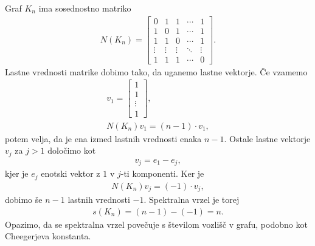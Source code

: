 \begin{primer}\label{polni-grafi-racun}
    Graf \(K_n\) ima sosednostno matriko
    \begin{align*}
        N(K_n) = \begin{bmatrix}
                     0      & 1      & 1      & \cdots & 1      \\
                     1      & 0      & 1      & \cdots & 1      \\
                     1      & 1      & 0      & \cdots & 1      \\
                     \vdots & \vdots & \vdots & \ddots & \vdots \\
                     1      & 1      & 1      & \cdots & 0
                 \end{bmatrix}.
    \end{align*}
    Lastne vrednosti matrike dobimo tako, da uganemo lastne vektorje. Če vzamemo
    \begin{align*}
        v_1 = \begin{bmatrix}
                  1      \\
                  1      \\
                  \vdots \\
                  1
              \end{bmatrix}, \\
        N(K_n) v_1 = (n-1) \cdot v_1,
    \end{align*}
    potem velja, da je ena izmed lastnih vrednosti enaka \(n-1\). Ostale lastne vektorje \(v_j\) za \(j>1\) določimo kot
    \begin{align*}
        v_j = e_1 - e_j,
    \end{align*}
    kjer je \(e_j\) enotski vektor z \(1\) v \(j\)-ti komponenti. Ker je
    \begin{align*}
        N(K_n)v_j = (-1) \cdot v_j,
    \end{align*}
    dobimo še \(n-1\) lastnih vrednosti \(-1\). Spektralna vrzel je torej
    \begin{align*}
        s(K_n) = (n-1) - (-1) = n.
    \end{align*}
    Opazimo, da se spektralna vrzel povečuje s številom vozlišč v grafu, podobno kot Cheegerjeva konstanta.
\end{primer}
